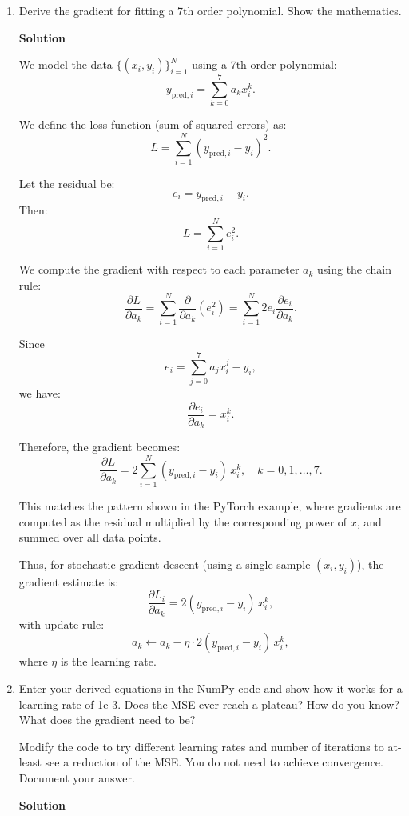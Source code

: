 \documentclass[10pt]{article}
\begin{document}
\begin{enumerate}[label=\textbf{1(\alph*)}]
    \item Derive the gradient for fitting a 7th order polynomial. Show the mathematics.

\textbf{Solution}

We model the data $\{(x_i, y_i)\}_{i=1}^N$ using a 7th order polynomial:
\[
y_{\text{pred},i} = \sum_{k=0}^{7} a_k x_i^k.
\]

We define the loss function (sum of squared errors) as:
\[
L = \sum_{i=1}^{N} (y_{\text{pred},i} - y_i)^2.
\]

Let the residual be:
\[
e_i = y_{\text{pred},i} - y_i.
\]
Then:
\[
L = \sum_{i=1}^{N} e_i^2.
\]

We compute the gradient with respect to each parameter $a_k$ using the chain rule:
\[
\frac{\partial L}{\partial a_k}
= \sum_{i=1}^{N} \frac{\partial}{\partial a_k}(e_i^2)
= \sum_{i=1}^{N} 2e_i \frac{\partial e_i}{\partial a_k}.
\]

Since
\[
e_i = \sum_{j=0}^{7} a_j x_i^j - y_i,
\]
we have:
\[
\frac{\partial e_i}{\partial a_k} = x_i^k.
\]

Therefore, the gradient becomes:
\[
\frac{\partial L}{\partial a_k}
= 2 \sum_{i=1}^{N} (y_{\text{pred},i} - y_i)\, x_i^k, \quad k = 0,1,\dots,7.
\]

This matches the pattern shown in the PyTorch example, where gradients are computed as the residual multiplied by the corresponding power of $x$, and summed over all data points.

\medskip

Thus, for stochastic gradient descent (using a single sample $(x_i, y_i)$), the gradient estimate is:
\[
\frac{\partial L_i}{\partial a_k}
= 2 (y_{\text{pred},i} - y_i)\, x_i^k,
\]
with update rule:
\[
a_k \leftarrow a_k - \eta \cdot 2 (y_{\text{pred},i} - y_i)\, x_i^k,
\]
where $\eta$ is the learning rate.

\newpage

    \item Enter your derived equations in the NumPy code and show how it works for a learning rate of 1e-3. Does the MSE ever reach a plateau? How do you know? What does the gradient need to be?

    Modify the code to try different learning rates and number of iterations to at-least see a reduction of the MSE. You do not need to achieve convergence. Document your answer.

\textbf{Solution}


\end{enumerate}
\end{document}
